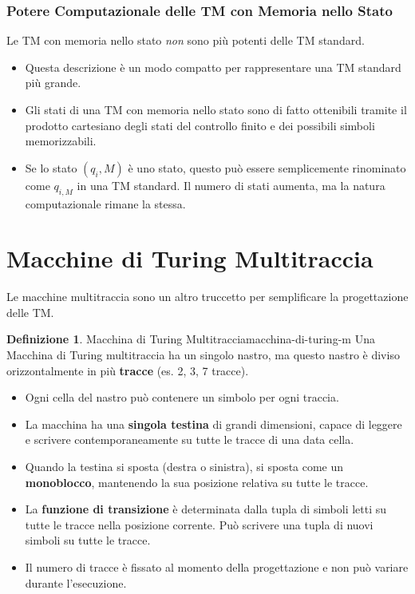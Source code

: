 \documentclass[a4paper]{article}
\theoremstyle{definition} %
\newtheorem{definition}{Definizione}
\begin{document}
\subsubsection{Potere Computazionale delle TM con Memoria nello Stato}
Le TM con memoria nello stato \emph{non} sono più potenti delle TM standard.
\begin{itemize}
    \item Questa descrizione è un modo compatto per rappresentare una TM standard più grande.
    \item Gli stati di una TM con memoria nello stato sono di fatto ottenibili tramite il prodotto cartesiano degli stati del controllo finito e dei possibili simboli memorizzabili.
    \item Se lo stato $(q_i, M)$ è uno stato, questo può essere semplicemente rinominato come $q_{i,M}$ in una TM standard. Il numero di stati aumenta, ma la natura computazionale rimane la stessa.
\end{itemize}

\section{Macchine di Turing Multitraccia}
Le macchine multitraccia sono un altro truccetto per semplificare la progettazione delle TM.

\begin{definition}{Macchina di Turing Multitraccia}{macchina-di-turing-m}
Una Macchina di Turing multitraccia ha un singolo nastro, ma questo nastro è diviso orizzontalmente in più \textbf{tracce} (es. 2, 3, 7 tracce).
\begin{itemize}
    \item Ogni cella del nastro può contenere un simbolo per ogni traccia.
    \item La macchina ha una \textbf{singola testina} di grandi dimensioni, capace di leggere e scrivere contemporaneamente su tutte le tracce di una data cella.
    \item Quando la testina si sposta (destra o sinistra), si sposta come un \textbf{monoblocco}, mantenendo la sua posizione relativa su tutte le tracce.
    \item La \textbf{funzione di transizione} è determinata dalla tupla di simboli letti su tutte le tracce nella posizione corrente. Può scrivere una tupla di nuovi simboli su tutte le tracce.
    \item Il numero di tracce è fissato al momento della progettazione e non può variare durante l'esecuzione.
\end{itemize}
\end{definition}
\end{document}
